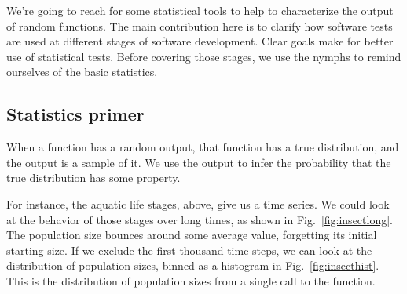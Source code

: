 \documentclass[fleqn,10pt]{olplainarticle}
\begin{document}
We're going to reach for some statistical tools to help
to characterize the output of random functions. The main
contribution here is to clarify how software tests are used
at different stages of software development. Clear goals
make for better use of statistical tests. Before covering
those stages, we use the nymphs to remind ourselves of the
basic statistics.

\subsection{Statistics primer}

When a function has a random output, that function has
a true distribution, and the output is a sample of it.
We use the output to infer the probability that the true
distribution has some property.

For instance, the aquatic life stages, above, give us a
time series. We could look at the behavior of those stages
over long times, as shown in Fig.~\ref{fig:insectlong}.
The population size bounces around some average value,
forgetting its initial starting size.
If we exclude the first thousand time steps, we can look
at the distribution of population sizes, binned as a histogram
in Fig.~\ref{fig:insecthist}. This is the distribution of
population sizes from a single call to the function.
\end{document}
